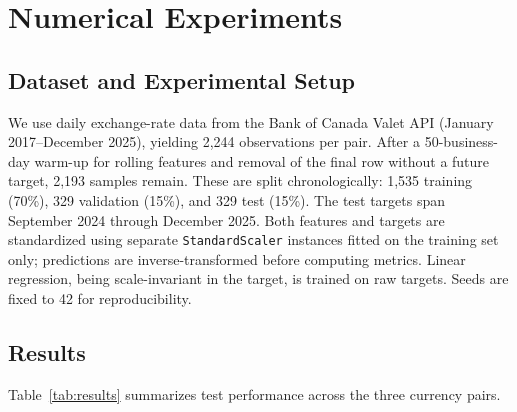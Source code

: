 \documentclass{article}
\begin{document}
\section{Numerical Experiments}

\subsection{Dataset and Experimental Setup}

We use daily exchange-rate data from the Bank of Canada Valet API (January 2017--December 2025), yielding 2,244 observations per pair. After a 50-business-day warm-up for rolling features and removal of the final row without a future target, 2,193 samples remain. These are split chronologically: 1,535 training (70\%), 329 validation (15\%), and 329 test (15\%). The test targets span September 2024 through December 2025. Both features and targets are standardized using separate \texttt{StandardScaler} instances fitted on the training set only; predictions are inverse-transformed before computing metrics. Linear regression, being scale-invariant in the target, is trained on raw targets. Seeds are fixed to 42 for reproducibility.

\subsection{Results}

Table~\ref{tab:results} summarizes test performance across the three currency pairs.
\end{document}
